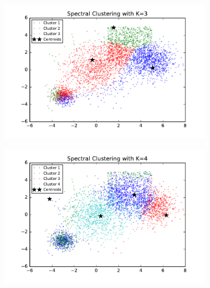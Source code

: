\begin{description}
\begin{description}
\begin{figure}[!h]
        \centering
        \begin{subfigure}[b]{0.475\textwidth}
            \centering
            \includegraphics[width=\textwidth]{./figures/bigClustering_spectral_3.pdf}
        \end{subfigure}
        \hfill
        \begin{subfigure}[b]{0.475\textwidth}  
            \centering 
            \includegraphics[width=\textwidth]{./figures/bigClustering_spectral_4.pdf}
        \end{subfigure}
        \begin{subfigure}[b]{0.475\textwidth}  
            \centering 

\end{subfigure}
\end{figure}
\end{description}
\end{description}
